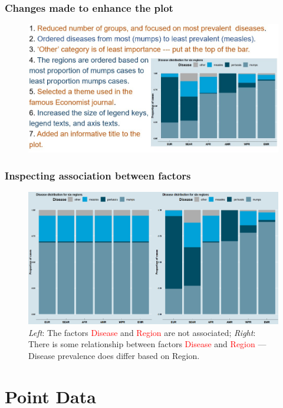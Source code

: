 \documentclass{beamer}
\begin{document}
\begin{frame}\frametitle{Changes made to enhance the plot}
\begin{figure}
\includegraphics[width=0.99\linewidth]{PlotsLec1/EnhancedStackedBarPoints}
\end{figure}
\end{frame}

\begin{frame}\frametitle{Inspecting association between factors}
\begin{figure}
\includegraphics[width=0.99\linewidth]{PlotsLec1/InteractionTestingUsingStackedBar}
\caption{\textit{Left}: The factors \textcolor{red}{Disease} and \textcolor{red}{Region} are not associated; \textit{Right}: There is some relationship between factors \textcolor{red}{Disease} and \textcolor{red}{Region} --- Disease prevalence does differ based on Region.}
\end{figure}
\end{frame}

\section{Point Data}
\end{document}
